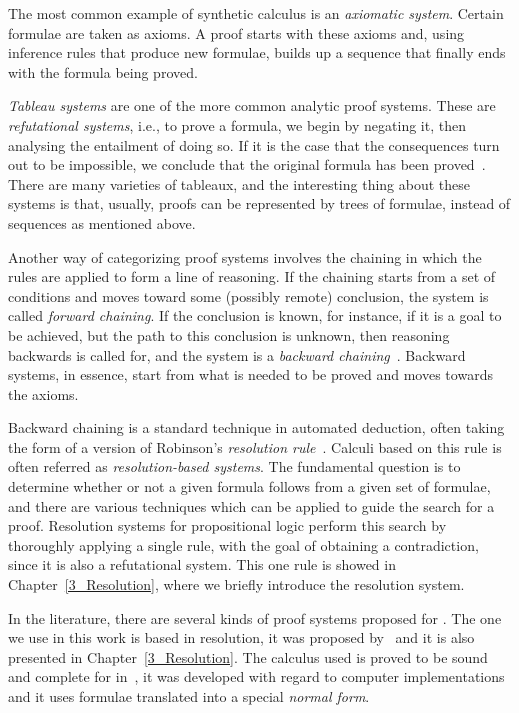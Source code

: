 The most common example of synthetic calculus is an \emph{axiomatic system}. Certain
formulae are taken as axioms. A proof starts with these axioms and, using
inference rules that produce new formulae, builds up a sequence that finally
ends with the formula being proved.

\emph{Tableau systems} are one of the more common analytic proof systems.
These are \emph{refutational systems}, i.e., to prove a formula, we begin by
negating it, then analysing the entailment of doing so. If it is the case that
the consequences turn out to be impossible, we conclude that the original
formula has been proved~\cite{fitting}. There are many varieties of tableaux,
and the interesting thing about these systems is that, usually, proofs can be
represented by trees of formulae, instead of sequences as mentioned above.

Another way of categorizing proof systems involves the chaining in which the
rules are applied to form a line of reasoning. If the chaining starts from a set
of conditions and moves toward some (possibly remote) conclusion, the system is
called \emph{forward chaining}. If the conclusion is known, for instance, if it
is a goal to be achieved, but the path to this conclusion is unknown, then
reasoning backwards is called for, and the system is a \emph{backward
chaining}~\cite{feigenbaum1988rise}. Backward systems, in essence, start from
what is needed to be proved and moves towards the axioms.

Backward chaining is a standard technique in automated deduction, often taking
the form of a version of Robinson's \emph{resolution
rule}~\cite{harland2000forward}. Calculi based on this rule is often referred as
\emph{resolution-based systems}. The fundamental question is to determine
whether or not a given formula follows from a given set of formulae, and there
are various techniques which can be applied to guide the search for a proof.
Resolution systems for propositional logic perform this search by thoroughly
applying a single rule, with the goal of obtaining a contradiction, since it is
also a refutational system. This one rule is showed in
Chapter~\ref{3_Resolution}, where we briefly introduce the resolution system.

In the literature, there are several kinds of proof systems proposed for
. The one we use in this work is based in resolution, it was
proposed by~\cite{nalon2015modal} and it is also presented in
Chapter~\ref{3_Resolution}. The calculus used is proved to be sound and complete
for  in~\cite{nalon2015modal}, it was developed with regard to
computer implementations and it uses formulae translated into a special
\emph{normal form}.

